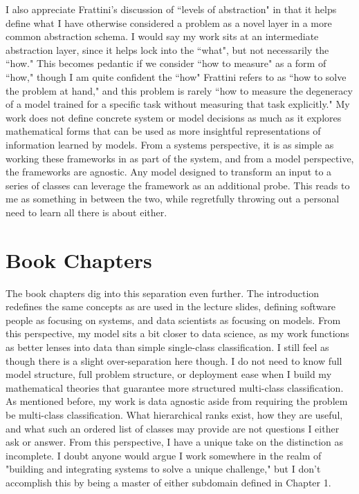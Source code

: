 \documentclass{article}
\begin{document}
I also appreciate Frattini's discussion of ``levels of abstraction" in that it helps define what I have otherwise considered a problem as a novel layer in a more common abstraction schema. 
I would say my work sits at an intermediate abstraction layer, since it helps lock into the ``what", but not necessarily the ``how."
This becomes pedantic if we consider ``how to measure" as a form of ``how," though I am quite confident the ``how" Frattini refers to as ``how to solve the problem at hand," and this problem is rarely ``how to measure the degeneracy of a model trained for a specific task without measuring that task explicitly."
My work does not define concrete system or model decisions as much as it explores mathematical forms that can be used as more insightful representations of information learned by models. 
From a systems perspective, it is as simple as working these frameworks in as part of the system, and from a model perspective, the frameworks are agnostic. 
Any model designed to transform an input to a series of classes can leverage the framework as an additional probe.
This reads to me as something in between the two, while regretfully throwing out a personal need to learn all there is about either.

\section{Book Chapters}

The book chapters dig into this separation even further.
The introduction redefines the same concepts as are used in the lecture slides, defining software people as focusing on systems, and data scientists as focusing on models. 
From this perspective, my model sits a bit closer to data science, as my work functions as better lenses into data than simple single-class classification.
I still feel as though there is a slight over-separation here though.
I do not need to know full model structure, full problem structure, or deployment ease when I build my mathematical theories that guarantee more structured multi-class classification. 
As mentioned before, my work is data agnostic aside from requiring the problem be multi-class classification.
What hierarchical ranks exist, how they are useful, and what such an ordered list of classes may provide are not questions I either ask or answer.
From this perspective, I have a unique take on the distinction as incomplete. 
I doubt anyone would argue I work somewhere in the realm of "building and integrating systems to solve a unique challenge," but I don't accomplish this by being a master of either subdomain defined in Chapter 1.
\end{document}
